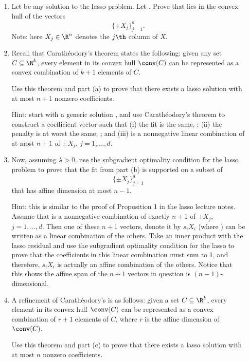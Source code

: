 \documentclass{article}
\begin{document}
\begin{enumerate}[label=(\alph*)]
\item Let \smash{$\hbeta$} be any solution to the lasso problem. Let
  . Prove that  lies in the convex hull of the vectors 
  \marginpar{\small [2 pts]}
  \[
  \{ \pm X_j \}_{j=1}^d.
  \]
  Note: here $X_j \in \R^n$ denotes the $j\th$ column of $X$.

\item Recall that Carath\'{e}odory's theorem states the following: given any set 
  $C \subseteq \R^k$, every element in its convex hull $\conv(C)$ can be 
  represented as a convex combination of $k+1$ elements of $C$. 

  Use this theorem and part (a) to prove that there exists a lasso solution
  \smash{$\tilde\beta$} with at most $n+1$ nonzero coefficients.  
  \marginpar{\small [2 pts]}

  Hint: start with a generic solution \smash{$\hbeta$}, and use
  Carath\'{e}odory's theorem to construct a coefficient vector
  \smash{$\tilde\beta$} such that (i) the fit is the same, ; (ii) the penalty is at worst the same,
  ; and (iii)
   is a nonnegative linear combination of at most $n+1$ of
  $\pm X_j$, $j=1,\dots,d$.  
 
\item Now, assuming $\lambda>0$, use the subgradient optimality condition for 
  the lasso problem to prove that the fit  from part (b)
  is supported on a subset of 
 \marginpar{\small [3 pts]}
  \[
  \{ \pm X_j \}_{j=1}^d
  \]
  that has affine dimension at most $n-1$.

  Hint: this is similar to the proof of Proposition 1 in the lasso lecture
  notes. Assume that  is a nonnegative combination of 
  exactly $n+1$ of $\pm X_j$, $j=1,\dots,d$. Then one of these $n+1$ vectors, 
  denote it by $s_i X_i$ (where ) can be
  written as a linear combination of the others. Take an inner product with the
  lasso residual and use the subgradient optimality condition for the lasso to
  prove that the coefficients in this linear combination must sum to 1, and
  therefore, $s_i X_i$ is actually an affine combination of the others. Notice
  that this shows the affine span of the $n+1$ vectors in question is
  $(n-1)$-dimensional.     

\item A refinement of Carath\'{e}odory's is as follows: given a set $C \subseteq
  \R^k$, every element in its convex hull $\conv(C)$ can be represented as a
  convex combination of $r+1$ elements of $C$, where $r$ is the affine dimension
  of $\conv(C)$. 

 Use this theorem and part (c) to prove that there exists a lasso solution
  \smash{$\check\beta$} with at most $n$ nonzero coefficients.  
  \marginpar{\small [2 pts]}
\end{enumerate}
\end{document}

